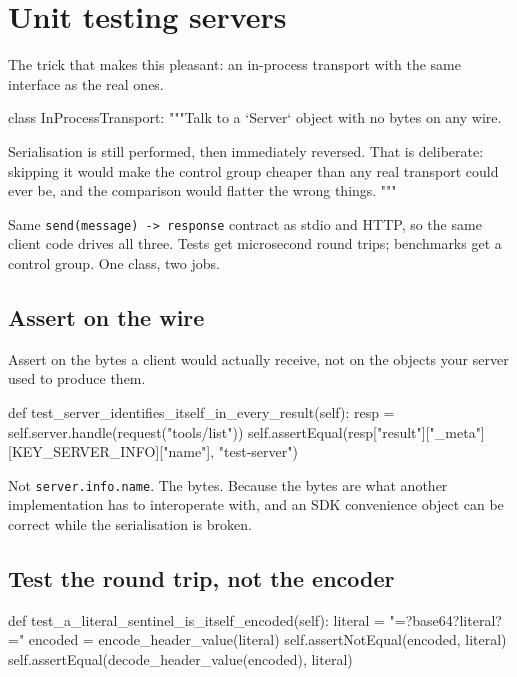 
\section{Unit testing servers}

The trick that makes this pleasant: an in-process transport with the same
interface as the real ones.

\begin{py}
class InProcessTransport:
    """Talk to a `Server` object with no bytes on any wire.

    Serialisation is still performed, then immediately reversed. That is
    deliberate: skipping it would make the control group cheaper than any real
    transport could ever be, and the comparison would flatter the wrong things.
    """
\end{py}

Same \texttt{send(message) -> response} contract as stdio and HTTP, so the same
client code drives all three. Tests get microsecond round trips; benchmarks get
a control group. One class, two jobs.

\subsection{Assert on the wire}

Assert on the bytes a client would actually receive, not on the objects your
server used to produce them.

\begin{py}
def test_server_identifies_itself_in_every_result(self):
    resp = self.server.handle(request("tools/list"))
    self.assertEqual(resp["result"]["_meta"][KEY_SERVER_INFO]["name"],
                     "test-server")
\end{py}

Not \texttt{server.info.name}. The bytes. Because the bytes are what another
implementation has to interoperate with, and an SDK convenience object can be
correct while the serialisation is broken.

\subsection{Test the round trip, not the encoder}

\begin{py}
def test_a_literal_sentinel_is_itself_encoded(self):
    literal = "=?base64?literal?="
    encoded = encode_header_value(literal)
    self.assertNotEqual(encoded, literal)
    self.assertEqual(decode_header_value(encoded), literal)
\end{py}

